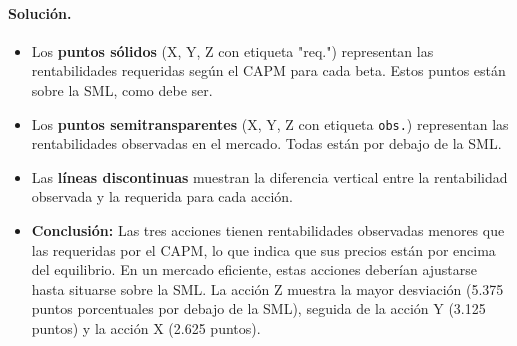 \documentclass[12pt,a4paper]{article}
\newenvironment{solucion}{\paragraph{Solución.}}{}
\begin{document}
\begin{solucion}
\begin{enumerate}[label=\alph*)]
\begin{itemize}
    \item Los \textbf{puntos sólidos} (X, Y, Z con etiqueta "req.") representan las rentabilidades requeridas según el CAPM para cada beta. Estos puntos están sobre la SML, como debe ser.
    
    \item Los \textbf{puntos semitransparentes} (X, Y, Z con etiqueta \texttt{obs.}) representan las rentabilidades observadas en el mercado. Todas están por debajo de la SML.
    
    \item Las \textbf{líneas discontinuas} muestran la diferencia vertical entre la rentabilidad observada y la requerida para cada acción.
    
    \item \textbf{Conclusión:} Las tres acciones tienen rentabilidades observadas menores que las requeridas por el CAPM, lo que indica que sus precios están por encima del equilibrio. En un mercado eficiente, estas acciones deberían ajustarse hasta situarse sobre la SML. La acción Z muestra la mayor desviación (5.375 puntos porcentuales por debajo de la SML), seguida de la acción Y (3.125 puntos) y la acción X (2.625 puntos).
  \end{itemize}
\end{enumerate}
\end{solucion}
\end{document}
